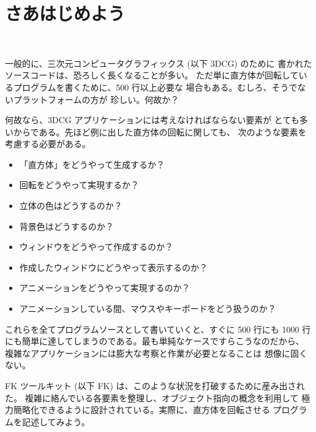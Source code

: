 \chapter{さあはじめよう} \label{sec:intro} ~

一般的に、三次元コンピュータグラフィックス (以下 3DCG) のために
書かれたソースコードは、恐ろしく長くなることが多い。
ただ単に直方体が回転しているプログラムを書くために、500 行以上必要な
場合もある。むしろ、そうでないプラットフォームの方が
珍しい。何故か？

何故なら、3DCG アプリケーションには考えなければならない要素が
とても多いからである。先ほど例に出した直方体の回転に関しても、
次のような要素を考慮する必要がある。
\begin{itemize}
 \item 「直方体」をどうやって生成するか？
 \item 回転をどうやって実現するか？
 \item 立体の色はどうするのか？
 \item 背景色はどうするのか？
 \item ウィンドウをどうやって作成するのか？
 \item 作成したウィンドウにどうやって表示するのか？
 \item アニメーションをどうやって実現するのか？
 \item アニメーションしている間、マウスやキーボードをどう扱うのか？
\end{itemize}
これらを全てプログラムソースとして書いていくと、すぐに 500 行にも
1000 行にも簡単に達してしまうのである。最も単純なケースですらこうなのだから、
複雑なアプリケーションには膨大な考察と作業が必要となることは
想像に固くない。

FK ツールキット (以下 FK) は、このような状況を打破するために産み出された。
複雑に絡んでいる各要素を整理し、オブジェクト指向の概念を利用して
極力簡略化できるように設計されている。実際に、直方体を回転させる
プログラムを記述してみよう。
